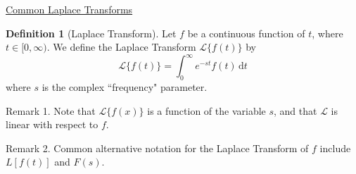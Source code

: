 \documentclass[letterpaper,11pt]{article} %
\theoremstyle{definition}
\newtheorem*{definition*}{Definition}
\begin{document}
    \begin{center}
        \LARGE{\underline{Common Laplace Transforms}} \\
    \end{center}

    \begin{definition*}[Laplace Transform]
        Let $f$ be a continuous function of $t$, where $t \in [0, \infty)$. We define the Laplace Transform $\mathcal L\{f(t)\}$ by
        \begin{equation*}
            \mathcal L\{f(t)\} = \int_0^\infty e^{-st} f(t) \, \mathrm dt
        \end{equation*}
        where $s$ is the complex ``frequency" parameter.
        
        Remark 1. Note that $\mathcal L\{f(x)\}$ is a function of the variable $s$, and that $\mathcal L$ is linear with respect to $f$.
        
        Remark 2. Common alternative notation for the Laplace Transform of $f$ include $L[f(t)]$ and $F(s)$.
    \end{definition*}
    
\end{document}
